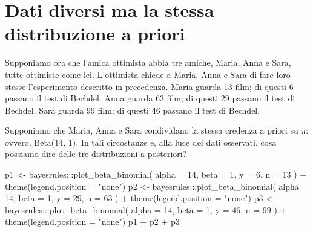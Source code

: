 \documentclass[
  11pt,
]{krantz}
\makeatletter
\newenvironment{Shaded}{\begin{snugshade}}{\end{snugshade}}
\newcommand{\AttributeTok}[1]{\textcolor[rgb]{0.61,0.61,0.61}{#1}}
\newcommand{\DecValTok}[1]{\textcolor[rgb]{0.06,0.06,0.06}{#1}}
\newcommand{\FunctionTok}[1]{\textcolor[rgb]{0,0,0}{#1}}
\newcommand{\NormalTok}[1]{#1}
\newcommand{\OtherTok}[1]{\textcolor[rgb]{0.37,0.37,0.37}{#1}}
\newcommand{\SpecialCharTok}[1]{\textcolor[rgb]{0,0,0}{#1}}
\newcommand{\StringTok}[1]{\textcolor[rgb]{0.5,0.5,0.5}{#1}}
\newenvironment{kframe}{%
\medskip{}
\setlength{\fboxsep}{.8em}
 \def\at@end@of@kframe{}%
 \ifinner\ifhmode%
  \def\at@end@of@kframe{\end{minipage}}%
  \begin{minipage}{\columnwidth}%
 \fi\fi%
 \def\FrameCommand##1{\hskip\@totalleftmargin \hskip-\fboxsep
 \colorbox{shadecolor}{##1}\hskip-\fboxsep
     \hskip-\linewidth \hskip-\@totalleftmargin \hskip\columnwidth}%
 \MakeFramed {\advance\hsize-\width
   \@totalleftmargin\z@ \linewidth\hsize
   \@setminipage}}%
 {\par\unskip\endMakeFramed%
 \at@end@of@kframe}
\renewenvironment{Shaded}{\begin{kframe}}{\end{kframe}}
\theoremstyle{definition}
\theoremstyle{definition}
\theoremstyle{definition}
\theoremstyle{definition}
\theoremstyle{remark}
\makeatother
\begin{document}
\hypertarget{dati-diversi-ma-la-stessa-distribuzione-a-priori}{%
\section{Dati diversi ma la stessa distribuzione a priori}\label{dati-diversi-ma-la-stessa-distribuzione-a-priori}}

Supponiamo ora che l'amica ottimista abbia tre amiche, Maria, Anna e Sara, tutte ottimiste come lei. L'ottimista chiede a Maria, Anna e Sara di fare loro stesse l'esperimento descritto in precedenza. Maria guarda 13 film; di questi 6 passano il test di Bechdel. Anna guarda 63 film; di questi 29 passano il test di Bechdel. Sara guarda 99 film; di questi 46 passano il test di Bechdel.

Supponiamo che Maria, Anna e Sara condividano la stessa credenza a priori su \(\pi\): ovvero, Beta(14, 1). In tali circostanze e, alla luce dei dati osservati, cosa possiamo dire delle tre distribuzioni a posteriori?

\begin{Shaded}
\begin{Highlighting}[]
\NormalTok{p1 }\OtherTok{\textless{}{-}}\NormalTok{ bayesrules}\SpecialCharTok{:::}\FunctionTok{plot\_beta\_binomial}\NormalTok{(}
  \AttributeTok{alpha =} \DecValTok{14}\NormalTok{, }\AttributeTok{beta =} \DecValTok{1}\NormalTok{, }\AttributeTok{y =} \DecValTok{6}\NormalTok{, }\AttributeTok{n =} \DecValTok{13}
\NormalTok{  ) }\SpecialCharTok{+} 
  \FunctionTok{theme}\NormalTok{(}\AttributeTok{legend.position =} \StringTok{"none"}\NormalTok{) }
\NormalTok{p2 }\OtherTok{\textless{}{-}}\NormalTok{ bayesrules}\SpecialCharTok{:::}\FunctionTok{plot\_beta\_binomial}\NormalTok{(}
  \AttributeTok{alpha =} \DecValTok{14}\NormalTok{, }\AttributeTok{beta =} \DecValTok{1}\NormalTok{, }\AttributeTok{y =} \DecValTok{29}\NormalTok{, }\AttributeTok{n =} \DecValTok{63}
\NormalTok{  ) }\SpecialCharTok{+} 
  \FunctionTok{theme}\NormalTok{(}\AttributeTok{legend.position =} \StringTok{"none"}\NormalTok{) }
\NormalTok{p3 }\OtherTok{\textless{}{-}}\NormalTok{ bayesrules}\SpecialCharTok{:::}\FunctionTok{plot\_beta\_binomial}\NormalTok{(}
  \AttributeTok{alpha =} \DecValTok{14}\NormalTok{, }\AttributeTok{beta =} \DecValTok{1}\NormalTok{, }\AttributeTok{y =} \DecValTok{46}\NormalTok{, }\AttributeTok{n =} \DecValTok{99}
\NormalTok{  ) }\SpecialCharTok{+}
  \FunctionTok{theme}\NormalTok{(}\AttributeTok{legend.position =} \StringTok{"none"}\NormalTok{) }
\NormalTok{p1 }\SpecialCharTok{+}\NormalTok{ p2 }\SpecialCharTok{+}\NormalTok{ p3}
\end{Highlighting}
\end{Shaded}
\end{document}
